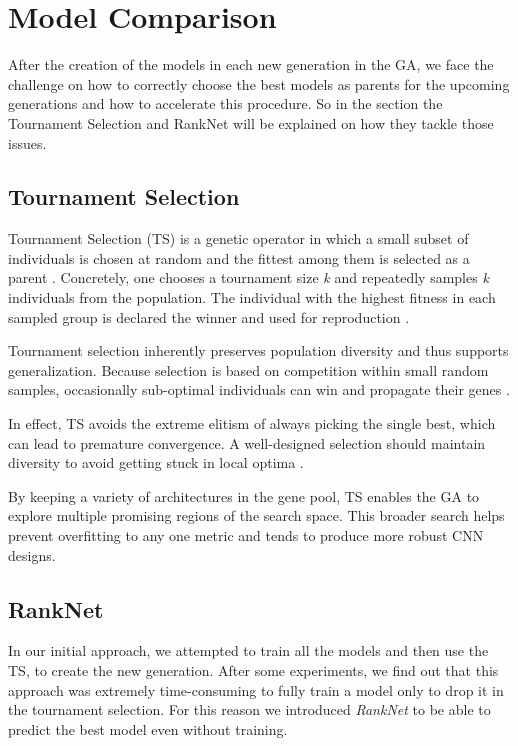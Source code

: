 \section{Model Comparison}
After the creation of the models in each new generation in the GA, we face the challenge on how to correctly choose the best models as parents for the upcoming generations and how to accelerate this procedure. So in the section the Tournament Selection and RankNet will be explained on how they tackle those issues. 



\subsection{Tournament Selection}
Tournament Selection (TS) is a genetic operator in which a small subset of individuals is chosen at random and the fittest among them is selected as a parent \cite{hussain2020trade}. 
Concretely, one chooses a tournament size \textit{k} and repeatedly samples \textit{k} individuals from the population. The individual with the highest fitness in each sampled group is declared the winner and used for reproduction \cite{hussain2020trade}.

Tournament selection inherently preserves population diversity and thus supports generalization. Because selection is based on competition within small random samples, occasionally sub-optimal individuals can win and propagate their genes \cite{hussain2020trade}.

In effect, TS avoids the extreme elitism of always picking the single best, which can lead to premature convergence. A well-designed selection should maintain diversity to avoid getting stuck in local optima \cite{filipovic2003fine}.

By keeping a variety of architectures in the gene pool, TS enables the GA to explore multiple promising regions of the search space. This broader search helps prevent overfitting to any one metric and tends to produce more robust CNN designs.


\subsection{RankNet}

In our initial approach, we attempted to train all the models and then use the TS, to create the new generation. After some experiments, we find out that this approach was extremely time-consuming to fully train a model only to drop it in the tournament selection. For this reason we introduced \textit{RankNet} to be able to predict the best model even without training.

